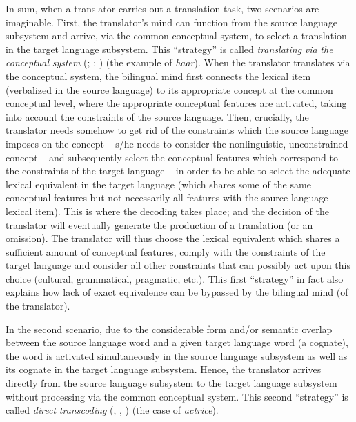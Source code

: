 In sum, when a translator carries out a translation task, two scenarios are imaginable. First, the translator’s mind can function from the source language subsystem and arrive, via the common conceptual system, to select a translation in the target language subsystem. This ``strategy'' is called \textit{translating} \textit{via} \textit{the} \textit{conceptual} \textit{system} (\citealt[54--55]{house_towards_2013}; \citeyear{house_translation_2015}; \citeyear[119--20]{house_translation_2016}) (the example of \textit{haar}). When the translator translates via the conceptual system, the bilingual mind first connects the lexical item (verbalized in the source language) to its appropriate concept at the common conceptual level, where the appropriate conceptual features are activated, taking into account the constraints of the source language. Then, crucially, the translator needs somehow to get rid of the constraints which the source language imposes on the concept – s\slash he needs to consider the nonlinguistic, unconstrained concept – and subsequently select the conceptual features which correspond to the constraints of the target language – in order to be able to select the adequate lexical equivalent in the target language (which shares some of the same conceptual features but not necessarily all features with the source language lexical item). This is where the decoding takes place; and the decision of the translator will eventually generate the production of a translation (or an omission). The translator will thus choose the lexical equivalent which shares a sufficient amount of conceptual features, comply with the constraints of the target language and consider all other constraints that can possibly act upon this choice (cultural, grammatical, pragmatic, etc.). This first ``strategy'' in fact also explains how lack of exact equivalence can be bypassed by the bilingual mind (of the translator).

In the second scenario, due to the considerable form and\slash or semantic overlap between the source language word and a given target language word (a cognate), the word is activated simultaneously in the source language subsystem as well as its cognate in the target language subsystem. Hence, the translator arrives directly from the source language subsystem to the target language subsystem without processing via the common conceptual system. This second ``strategy'' is called \textit{direct} \textit{transcoding} (\citealt[54--55]{house_towards_2013}, \citeyear{house_translation_2015}, \citeyear[119--120]{house_translation_2016}) (the case of \textit{actrice}).

